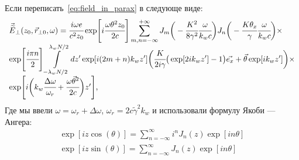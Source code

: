 \documentclass[14pt,a4paper]{extarticle}
\numberwithin{equation}{section}
\begin{document}
Если переписать~\ref{eq:field_in_parax} в следующе виде:
\begin{equation}
		\label{eq:field_in_parax_Bessel}
		\begin{array}{lcl}
			\vec{\widetilde{E}}_{\bot}(z_0,  \vec{r}_{\bot 0}, \omega) =
			\cfrac{i\omega e}{c^2z_0} \exp[i\cfrac{\omega \theta^2 z_0}{2c}]
			\displaystyle\sum_{m,n=-\infty}^{+\infty}
			J_m\bigg(-\cfrac{K^2}{8\gamma^2}\cfrac{\omega}{k_w c}\bigg)
			J_n\bigg(-\cfrac{K{\theta_x}}{\gamma}\cfrac{\omega}{k_w c}\bigg)\times\\
			\exp[\cfrac{i\pi n}{2}]
			\displaystyle\int\limits_{-\lambda_w N/2}^{\lambda_w N/2} dz'\exp[i(2m + n)k_wz']
			\bigg(\cfrac{K}{2i\gamma}\big(\exp[2ik_w z'] - 1\big)\vec{e_x} + \vec{\theta}\exp[ik_w z']\bigg)\times\\
			\exp[i\bigg(k_w \cfrac{\Delta\omega}{\omega_r} + 
			\cfrac{\omega\vec{\theta}^2}{2c}\bigg)z'],
		\end{array}	
\end{equation}
Где мы ввели $\omega = \omega_r + \Delta\omega$, $\omega_r = 2c\widetilde{\gamma}^2k_w$ и использовали формулу Якоби — Ангера:
\begin{equation}
	\begin{array}{lcl}
		\exp[iz\cos(\theta)] = 
		\displaystyle\sum\limits_{n =-\infty}^{\infty}
		i^n J_n(z)\exp[in\theta]\\	
		\exp[iz\sin(\theta)] = 
		\displaystyle\sum\limits_{n =-\infty}^{\infty}
		J_n(z)\exp[in\theta]
	\end{array}	
\end{equation}
\end{document}
